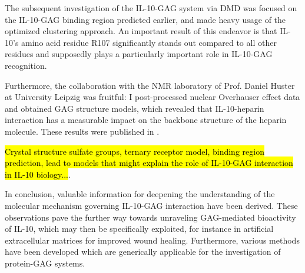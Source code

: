 The subsequent investigation of the IL-10-GAG system via DMD was focused on the
IL-10-GAG binding region predicted earlier, and made heavy usage of the
optimized clustering approach. An important result of this endeavor is that
IL-10's amino acid residue R107 significantly stands out compared to all other
residues and supposedly plays a particularly important role in IL-10-GAG
recognition.

Furthermore, the collaboration with the NMR laboratory of Prof. Daniel Huster at
University Leipzig was fruitful: I post-processed nuclear Overhauser effect data
and obtained GAG structure models, which revealed that IL-10-heparin interaction
has a measurable impact on the backbone structure of the heparin molecule. These
results were published in \cite{kuenze_gehrcke_2014}.

\hl{Crystal structure sulfate groups, ternary receptor model, binding region
prediction, lead to models that might explain the role of IL-10-GAG interaction
in IL-10 biology...}.

In conclusion, valuable information for deepening the understanding of the
molecular mechanism governing IL-10-GAG interaction have been derived. These
observations pave the further way towards unraveling GAG-mediated bioactivity of
IL-10, which may then be specifically exploited, for instance in artificial
extracellular matrices for improved wound healing. Furthermore, various methods
have been developed which are generically applicable for the investigation of
protein-GAG systems.
